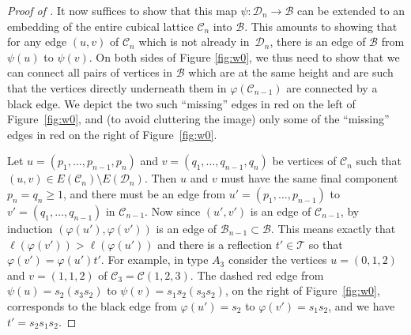 \documentclass[11pt]{amsart}
\theoremstyle{plain}
\theoremstyle{definition}
\newcommand{\cC}{\mathcal{C}}
\newcommand{\cD}{\mathcal{D}}
\newcommand{\cB}{\mathcal B}
\newcommand{\cT}{\mathcal T}
\numberwithin{equation}{subsection}
\begin{document}
\begin{proof}[Proof of ]
It now suffices to show that this map $\psi:\cD_n \to \cB$ can be extended to an embedding of the entire cubical lattice $\cC_n$ into $\cB$. This amounts to showing that for any edge $(u,v)$ of $\cC_n$ which is not already in~$\cD_n$, there is an edge of $\cB$ from $\psi(u)$ to $\psi(v)$. On both sides of Figure \ref{fig:w0}, we thus need to show that we can connect all pairs of vertices in $\cB$ which are at the same height and are such that the vertices directly underneath them in $\varphi(\cC_{n-1})$ are connected by a black edge. We depict the two such ``missing'' edges in red on the left of Figure~\ref{fig:w0}, and (to avoid cluttering the image) only some of the ``missing'' edges in red on the right of Figure~\ref{fig:w0}.

Let $u = (p_1, \dots, p_{n-1}, p_n)$ and $v = (q_1, \dots, q_{n-1},q_n)$ be vertices of $\cC_n$ such that $(u,v) \in E(\cC_n) \setminus E(\cD_n)$. Then $u$ and $v$ must have the same final component $p_n = q_n \geq 1$, and there must be an edge from $u' = (p_1, \dots, p_{n-1})$ to $v' = (q_1, \dots, q_{n-1})$ in $\cC_{n-1}$. 
Now since  $(u',v')$ is an edge of $\cC_{n-1}$, by induction $(\varphi(u'),\varphi(v'))$ is an edge of $\cB_{n-1} \subset \cB$. This means exactly that $\ell(\varphi(v')) > \ell(\varphi(u'))$ and there is a reflection $t' \in \cT$ so that $\varphi(v') = \varphi(u') t'$. 
For example, in type $A_3$ consider the vertices $u = (0,1,2)$ and $v = (1,1,2)$ of $\cC_3 = \cC(1,2,3)$. The dashed red edge from $\psi(u)=s_2(s_3s_2)$ to $\psi(v)=s_1s_2(s_3s_2)$, on the right of Figure~\ref{fig:w0}, corresponds to the black edge from $\varphi(u') = s_2$ to $\varphi(v') = s_1s_2$, and we have $t' = s_2 s_1 s_2$.






\end{proof}
\end{document}
